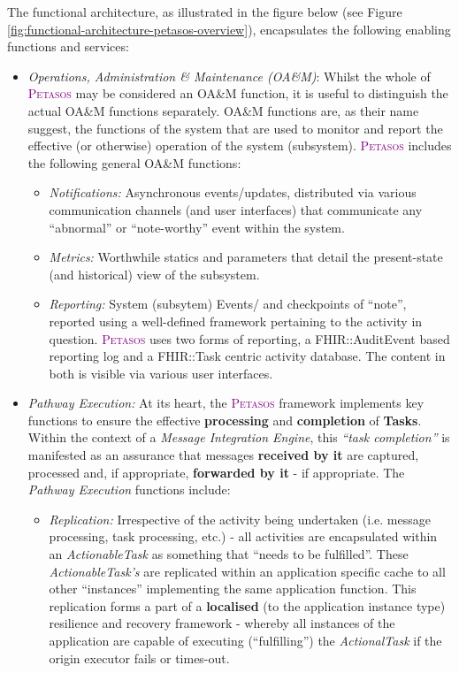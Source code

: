 \documentclass[a4paper]{book}
\newcommand{\petasos}{\textsc{\textcolor{Purple}{\small{Petasos }}}}
\begin{document}
    The functional architecture, as illustrated in the figure below (see Figure \ref{fig:functional-architecture-petasos-overview}), encapsulates the following enabling functions and services:
    \begin{itemize}
        \item \textit{Operations, Administration \& Maintenance (OA\&M)}: Whilst the whole of \petasos may be considered an OA\&M function, it is useful to distinguish the actual OA\&M functions separately. OA\&M functions are, as their name suggest, the functions of the system that are used to monitor and report the effective (or otherwise) operation of the system (subsystem). \petasos includes the following general OA\&M functions:
        \begin{itemize}
            \item \textit{Notifications:} Asynchronous events/updates, distributed via various communication channels (and user interfaces) that communicate any ``abnormal'' or ``note-worthy'' event within the system.
            \item \textit{Metrics:} Worthwhile statics and parameters that detail the present-state (and historical) view of the subsystem.
            \item \textit{Reporting:} System (subsytem) Events/ and checkpoints of ``note'', reported using a well-defined framework pertaining to the activity in question. \petasos uses two forms of reporting, a FHIR::AuditEvent based reporting log and a FHIR::Task centric activity database. The content in both is visible via various user interfaces.
        \end{itemize}
        \item \textit{Pathway Execution:} At its heart, the \petasos framework implements key functions to ensure the effective \textbf{processing} and \textbf{completion} of \textbf{Tasks}. Within the context of a \textit{Message Integration Engine}, this \textit{``task completion''} is manifested as an assurance that messages \textbf{received by it} are captured, processed and, if appropriate, \textbf{forwarded by it} - if appropriate. The \textit{Pathway Execution} functions include:
        \begin{itemize}
            \item \textit{Replication:} Irrespective of the activity being undertaken (i.e. message processing, task processing, etc.) - all activities are encapsulated within an \textit{ActionableTask} as something that ``needs to be fulfilled''. These \textit{ActionableTask's} are replicated within an application specific cache to all other ``instances'' implementing the same application function. This replication forms a part of a \textbf{localised} (to the application instance type) resilience and recovery framework - whereby all instances of the application are capable of executing (``fulfilling'') the \textit{ActionalTask} if the origin executor fails or times-out.

\end{itemize}
\end{itemize}
\end{document}
